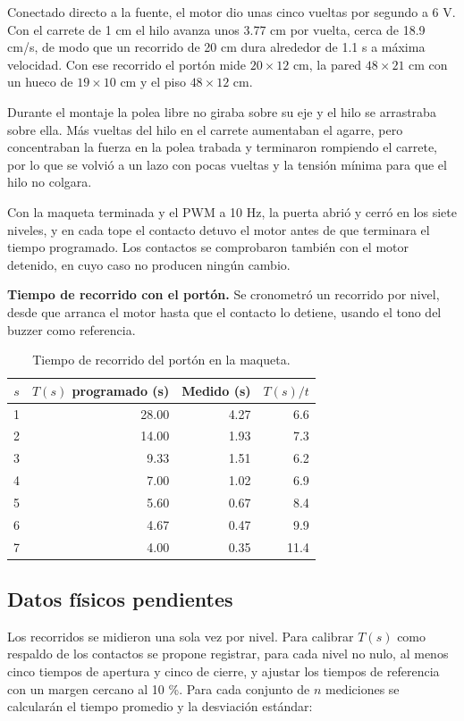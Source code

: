 \documentclass[12pt,letterpaper]{article}
\begin{document}
Conectado directo a la fuente, el motor dio unas cinco
vueltas por segundo a 6 V. Con el carrete de 1 cm el hilo
avanza unos 3.77 cm por vuelta, cerca de 18.9 cm/s, de
modo que un recorrido de 20 cm dura alrededor de 1.1 s a
máxima velocidad. Con ese recorrido el portón mide
$20\times12$ cm, la pared $48\times21$ cm con un hueco de
$19\times10$ cm y el piso $48\times12$ cm.

Durante el montaje la polea libre no giraba sobre su eje
y el hilo se arrastraba sobre ella. Más vueltas del hilo
en el carrete aumentaban el agarre, pero concentraban la
fuerza en la polea trabada y terminaron rompiendo el
carrete, por lo que se volvió a un lazo con pocas vueltas
y la tensión mínima para que el hilo no colgara.

Con la maqueta terminada y el PWM a 10 Hz, la puerta abrió
y cerró en los siete niveles, y en cada tope el contacto
detuvo el motor antes de que terminara el tiempo
programado. Los contactos se comprobaron también con el
motor detenido, en cuyo caso no producen ningún cambio.

\textbf{Tiempo de recorrido con el portón.} Se cronometró un
recorrido por nivel, desde que arranca el motor hasta que
el contacto lo detiene, usando el tono del buzzer como
referencia.

\begin{table}[H]
\centering
\begin{tabular}{@{}crrr@{}}
\toprule
$s$ & $T(s)$ programado (s) & Medido (s) & $T(s)/t$\\
\midrule
1 & 28.00 & 4.27 & 6.6\\
2 & 14.00 & 1.93 & 7.3\\
3 & 9.33 & 1.51 & 6.2\\
4 & 7.00 & 1.02 & 6.9\\
5 & 5.60 & 0.67 & 8.4\\
6 & 4.67 & 0.47 & 9.9\\
7 & 4.00 & 0.35 & 11.4\\
\bottomrule
\end{tabular}
\caption{Tiempo de recorrido del portón en la maqueta.}
\label{tab:recorrido}
\end{table}

\subsection{Datos físicos pendientes}

Los recorridos se midieron una sola vez por nivel. Para
calibrar $T(s)$ como respaldo de los contactos se propone
registrar, para cada nivel no nulo, al menos cinco tiempos
de apertura y cinco de cierre, y ajustar los tiempos de
referencia con un margen cercano al 10 \%. Para cada
conjunto de $n$ mediciones se calcularán el tiempo
promedio y la desviación estándar:
\end{document}
